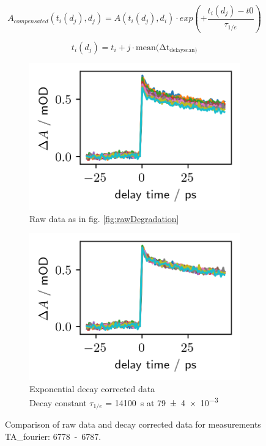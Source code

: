 \documentclass[twoside,openright]{scrreprt}
\begin{document}
\begin{equation}\label{eq:degradationCompensation}
A_{compensated}(t_i(d_j), d_j) = A(t_i(d_j), d_i)\cdot exp\left(+\frac{t_i(d_j)-t0}{\tau_{1/e}}\right)
\end{equation}

\begin{equation*}
t_i(d_j) = t_i + j\cdot \mathrm{mean(\Delta t_{delay scan)}}
\end{equation*}

\begin{figure}[hbtp]
\centering
\begin{subfigure}[t]{0.4\linewidth}
\centering
\includegraphics[scale=1]{images/DegradationRAWPump653Probe493-Graph.png}
\caption{Raw data as in fig. \ref{fig:rawDegradation}}
\end{subfigure}
\hfill
\begin{subfigure}[t]{0.4\linewidth}
\centering
\includegraphics[scale=1]{images/DegradationCorrectedPump653Probe493-Graph.png}
\caption{Exponential decay corrected data\\
Decay constant $\tau_{1/e}$ = \SI{14100}{\second} at \SI{79(4)e-3}{\radExp}}
\end{subfigure}
\caption{Comparison of raw data and decay corrected data for measurements TA\_fourier: \mbox{6778 - 6787}.\label{fig:degradationCorrectionComparison}}
\end{figure}
\end{document}
